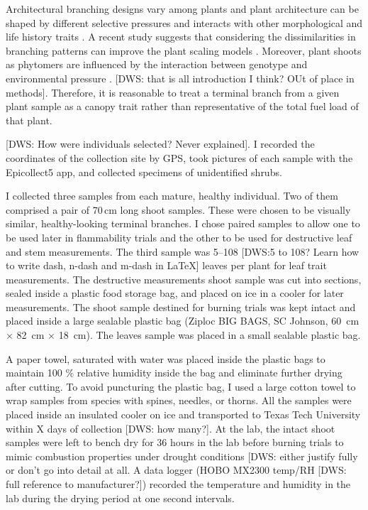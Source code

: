 \documentclass[12pt]{report}
\begin{document}
Architectural branching designs vary among plants \citep{halle2012tropical} and plant architecture can be shaped by different selective pressures \citep{danell1994browseeffects, schwilk2003flammability} and interacts with other morphological and life history traits \citep{ackerly1998leaf, schwilk2001flammability,archibald2003growing}. A recent study suggests that considering the dissimilarities in branching patterns can improve the plant scaling models \citep{bentley2013empirical}. Moreover, plant shoots as phytomers are influenced by the interaction between genotype and environmental pressure \citep{mcsteen2005shoot, wang2008molecular}. [DWS: that is all introduction I think? OUt of place in methods]. Therefore, it is reasonable to treat a terminal branch from a given plant sample as a canopy trait rather than representative of the total fuel load of that plant.

[DWS: How were individuals selected?  Never explained]. I recorded the coordinates of the collection site by GPS, took pictures of each sample with the Epicollect5 app, and collected specimens of unidentified shrubs.

I collected three samples from each mature, healthy individual. Two of them comprised a pair of 70\,cm long shoot samples. These were chosen to be visually similar, healthy-looking terminal branches. I chose paired samples to allow one to be used later in flammability trials and the other to be used for destructive leaf and stem measurements. The third sample was 5--108 [DWS:5 to 108? Learn how to write dash, n-dash and m-dash in LaTeX] leaves per plant for leaf trait measurements. The destructive measurements shoot sample was cut into sections, sealed inside a plastic food storage bag, and placed on ice in a cooler for later measurements. The shoot sample destined for burning trials was kept intact and placed inside a large sealable plastic bag (Ziploc BIG BAGS, SC Johnson, 60 \,cm × 82 \,cm × 18 \,cm). The leaves sample was placed in a small sealable plastic bag.

A paper towel, saturated with water was placed inside the plastic bags to maintain 100 \% relative humidity inside the bag and eliminate further drying after cutting. To avoid puncturing the plastic bag, I used a large cotton towel to wrap samples from species with spines, needles, or thorns. All the samples were placed inside an insulated cooler on ice and transported to Texas Tech University within X days of collection [DWS: how many?]. At the lab, the intact shoot samples were left to bench dry for 36 hours in the lab before burning trials \citep{wyse2016quantitative} to mimic combustion properties under drought conditions [DWS: either justify fully or don't go into detail at all. A data logger (HOBO MX2300 temp/RH [DWS: full reference to manufacturer?]) recorded the temperature and humidity in the lab during the drying period at one second intervals.
\end{document}

